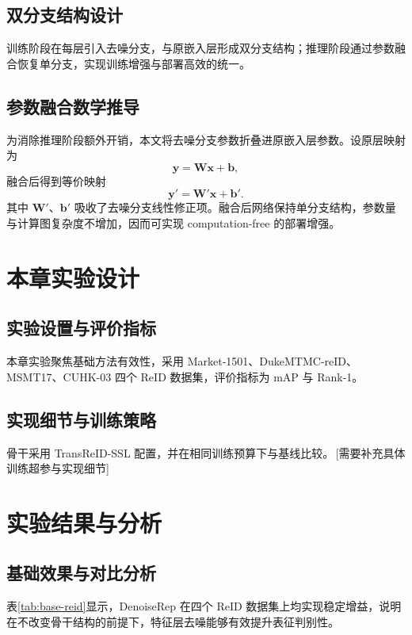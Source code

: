 \subsection{双分支结构设计}
训练阶段在每层引入去噪分支，与原嵌入层形成双分支结构；推理阶段通过参数融合恢复单分支，实现训练增强与部署高效的统一。

\subsection{参数融合数学推导}
为消除推理阶段额外开销，本文将去噪分支参数折叠进原嵌入层参数。设原层映射为
\begin{equation}
\mathbf{y}=\mathbf{W}\mathbf{x}+\mathbf{b},
\end{equation}
融合后得到等价映射
\begin{equation}
\mathbf{y}'=\mathbf{W}'\mathbf{x}+\mathbf{b}'.
\end{equation}
其中 $\mathbf{W}'$、$\mathbf{b}'$ 吸收了去噪分支线性修正项。融合后网络保持单分支结构，参数量与计算图复杂度不增加，因而可实现 computation-free 的部署增强。

\section{本章实验设计}
\subsection{实验设置与评价指标}
本章实验聚焦基础方法有效性，采用 Market-1501、DukeMTMC-reID、MSMT17、CUHK-03 四个 ReID 数据集，评价指标为 mAP 与 Rank-1。

\subsection{实现细节与训练策略}
骨干采用 TransReID-SSL 配置，并在相同训练预算下与基线比较。\,[需要补充具体训练超参与实现细节]

\section{实验结果与分析}
\subsection{基础效果与对比分析}
表\ref{tab:base-reid}显示，DenoiseRep 在四个 ReID 数据集上均实现稳定增益，说明在不改变骨干结构的前提下，特征层去噪能够有效提升表征判别性。

